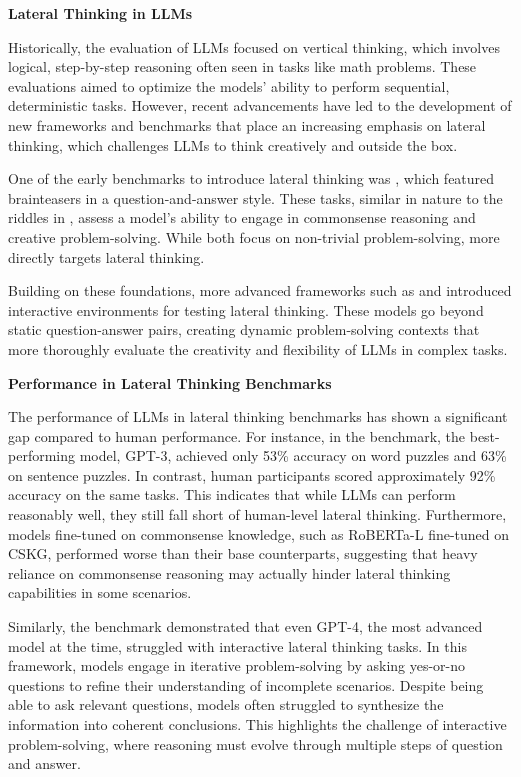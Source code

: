 \textbf{Lateral Thinking in \acp{LLM}}

Historically, the evaluation of \acp{LLM} focused on vertical thinking, which involves logical, step-by-step reasoning often seen in tasks like math problems. These evaluations aimed to optimize the models' ability to perform sequential, deterministic tasks. However, recent advancements have led to the development of new frameworks and benchmarks that place an increasing emphasis on lateral thinking, which challenges \acp{LLM} to think creatively and outside the box.

One of the early benchmarks to introduce lateral thinking was , which featured brainteasers in a question-and-answer style. These tasks, similar in nature to the riddles in , assess a model's ability to engage in commonsense reasoning and creative problem-solving. While both focus on non-trivial problem-solving,  more directly targets lateral thinking.

Building on these foundations, more advanced frameworks such as  and  introduced interactive environments for testing lateral thinking. These models go beyond static question-answer pairs, creating dynamic problem-solving contexts that more thoroughly evaluate the creativity and flexibility of \acp{LLM} in complex tasks.

\textbf{Performance in Lateral Thinking Benchmarks}

The performance of \acp{LLM} in lateral thinking benchmarks has shown a significant gap compared to human performance. For instance, in the  benchmark, the best-performing model, \ac{GPT}-3, achieved only 53\% accuracy on word puzzles and 63\% on sentence puzzles. In contrast, human participants scored approximately 92\% accuracy on the same tasks. This indicates that while \acp{LLM} can perform reasonably well, they still fall short of human-level lateral thinking. Furthermore, models fine-tuned on commonsense knowledge, such as RoBERTa-L fine-tuned on CSKG, performed worse than their base counterparts, suggesting that heavy reliance on commonsense reasoning may actually hinder lateral thinking capabilities in some scenarios.

Similarly, the  benchmark demonstrated that even \ac{GPT}-4, the most advanced model at the time, struggled with interactive lateral thinking tasks. In this framework, models engage in iterative problem-solving by asking yes-or-no questions to refine their understanding of incomplete scenarios. Despite being able to ask relevant questions, models often struggled to synthesize the information into coherent conclusions. This highlights the challenge of interactive problem-solving, where reasoning must evolve through multiple steps of question and answer.

